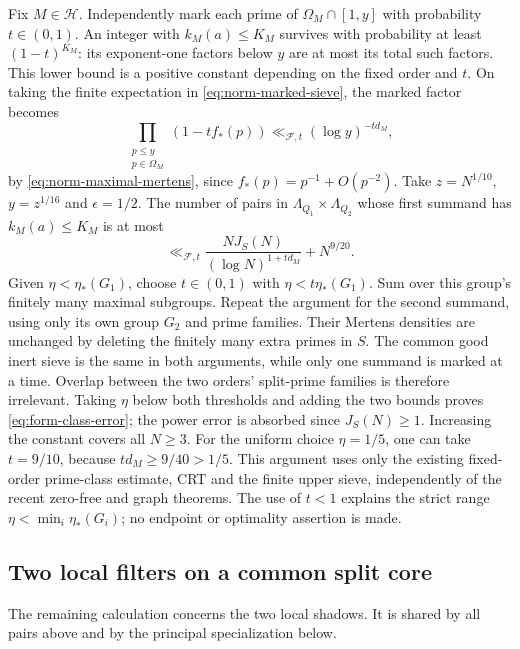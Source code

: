 Fix $M\in\mathcal H$. Independently mark each prime of
$\Omega_M\cap[1,y]$ with probability $t\in(0,1)$. An integer with
$k_M(a)\le K_M$ survives with probability at least $(1-t)^{K_M}$:
its exponent-one factors below $y$ are at most its total such factors.
This lower bound is a positive constant depending on the fixed order
and $t$. On taking the finite expectation in
\eqref{eq:norm-marked-sieve}, the marked factor becomes
\[
 \prod_{\substack{p\le y\\p\in\Omega_M}}(1-tf_*(p))
                 \ll_{\mathcal F,t}(\log y)^{-td_M},
\]
by \eqref{eq:norm-maximal-mertens}, since $f_*(p)=p^{-1}+O(p^{-2})$.
Take $z=N^{1/10}$, $y=z^{1/16}$ and $\epsilon=1/2$.
The number of pairs in \(\Lambda_{Q_1}\times\Lambda_{Q_2}\) whose first summand has
$k_M(a)\le K_M$ is at most
\[
 \ll_{\mathcal F,t}
 \frac{NJ_S(N)}{(\log N)^{1+td_M}}+N^{9/20}.
\]
Given \(\eta<\eta_*(G_1)\), choose \(t\in(0,1)\) with
\(\eta<t\eta_*(G_1)\). Sum over this group's finitely many maximal
subgroups. Repeat the argument for the second summand, using only its
own group \(G_2\) and prime families. Their Mertens densities are
unchanged by deleting the finitely many extra primes in \(S\).
The common good inert sieve is the same in both arguments, while
only one summand is marked at a time. Overlap between the two orders'
split-prime families is therefore irrelevant. Taking \(\eta\) below
both thresholds and adding the two bounds proves
\eqref{eq:form-class-error}; the power error is absorbed since
\(J_S(N)\ge1\). Increasing the constant covers all \(N\ge3\).
For the uniform choice $\eta=1/5$, one can take $t=9/10$, because
$td_M\ge9/40>1/5$. This argument uses only the existing fixed-order
prime-class estimate, CRT and the finite upper sieve, independently
of the recent zero-free and graph theorems.
The use of \(t<1\) explains the strict range \(\eta<\min_i\eta_*(G_i)\);
no endpoint or optimality assertion is made.

\subsection{Two local filters on a common split core}\label{sec:form-local-assembly}

The remaining calculation concerns the two local shadows. It is shared
by all pairs above and by the principal specialization below.

